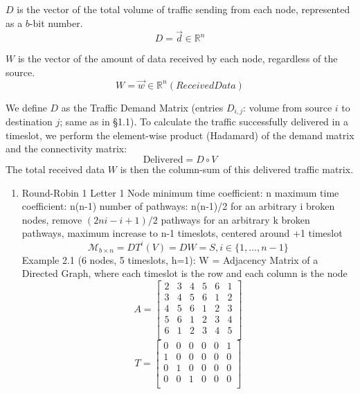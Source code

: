 \documentclass{article}
\begin{document}
    $D$ is the vector of the total volume of traffic sending from each node, represented as a $b$-bit number.
    \[
        D = \vec{d} \in \mathbb{R}^{n}
    \]
    
    $W$ is the vector of the amount of data received by each node, regardless of the source.
    \[
        W = \vec{w} \in \mathbb{R}^{n} (Received Data)
    \]

    We define $D$ as the Traffic Demand Matrix (entries $D_{i,j}$: volume from source $i$ to destination $j$; same as in \S1.1). To calculate the traffic successfully delivered in a timeslot, we perform the element-wise product (Hadamard) of the demand matrix and the connectivity matrix:
    \[
        \text{Delivered} = D \circ V
    \]
    The total received data $W$ is then the column-sum of this delivered traffic matrix.
    \begin{enumerate}
        \item Round-Robin 1 Letter 1 Node
            minimum time coefficient: n
            maximum time coefficient: n(n-1)
            number of pathways: n(n-1)/2
            for an arbitrary i broken nodes, remove $(2ni-i+1)/2$ pathways
            for an arbitrary k broken pathways, maximum increase to n-1 timeslots,
            centered around +1 timeslot
            \[
                \mathscr{M}_{b \times n}=DT^{i}(V) = DW = S, i \in \{1, ... ,n-1\}
            \]
            Example 2.1 (6 nodes, 5 timeslots, h=1):
            W = Adjacency Matrix of a Directed Graph, where each timeslot is the
            row and each column is the node
            \[
                A =
                \begin{bmatrix}
                    2 & 3 & 4 & 5 & 6 & 1 \\
                    3 & 4 & 5 & 6 & 1 & 2 \\
                    4 & 5 & 6 & 1 & 2 & 3 \\
                    5 & 6 & 1 & 2 & 3 & 4 \\
                    6 & 1 & 2 & 3 & 4 & 5 \\
                \end{bmatrix}
            \]
            \[
                T =
                \begin{bmatrix}
                    0 & 0 & 0 & 0 & 0 & 1 \\
                    1 & 0 & 0 & 0 & 0 & 0 \\
                    0 & 1 & 0 & 0 & 0 & 0 \\
                    0 & 0 & 1 & 0 & 0 & 0 \\

\end{bmatrix}\]
\end{enumerate}
\end{document}
